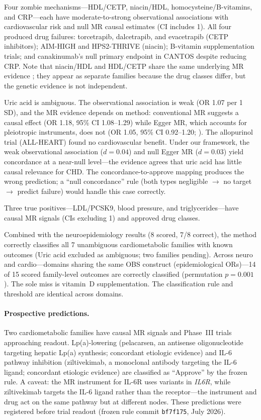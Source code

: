 \documentclass[11pt]{article}
\begin{document}
Four zombie mechanisms---HDL/CETP, niacin/HDL, homocysteine/B-vitamins, and CRP---each have moderate-to-strong observational associations with cardiovascular risk and null MR causal estimates (CI includes 1). All four produced drug failures: torcetrapib, dalcetrapib, and evacetrapib (CETP inhibitors); AIM-HIGH and HPS2-THRIVE (niacin); B-vitamin supplementation trials; and canakinumab's null primary endpoint in CANTOS despite reducing CRP. Note that niacin/HDL and HDL/CETP share the same underlying MR evidence \citep{voight2012}; they appear as separate families because the drug classes differ, but the genetic evidence is not independent.

Uric acid is ambiguous. The observational association is weak (OR 1.07 per 1 SD), and the MR evidence depends on method: conventional MR suggests a causal effect (OR 1.18, 95\% CI 1.08--1.29) while Egger MR, which accounts for pleiotropic instruments, does not (OR 1.05, 95\% CI 0.92--1.20; \citealp{white2016}). The allopurinol trial (ALL-HEART) found no cardiovascular benefit. Under our framework, the weak observational association ($d = 0.04$) and null Egger MR ($d = 0.03$) yield concordance at a near-null level---the evidence agrees that uric acid has little causal relevance for CHD. The concordance-to-approve mapping produces the wrong prediction; a ``null concordance'' rule (both types negligible $\to$ no target $\to$ predict failure) would handle this case correctly.

Three true positives---LDL/PCSK9, blood pressure, and triglycerides---have causal MR signals (CIs excluding 1) and approved drug classes.

Combined with the neuroepidemiology results (8 scored, 7/8 correct), the method correctly classifies all 7 unambiguous cardiometabolic families with known outcomes (Uric acid excluded as ambiguous; two families pending). Across neuro and cardio---domains sharing the same OBS construct (epidemiological ORs)---14 of 15 scored family-level outcomes are correctly classified (permutation $p = 0.001$). The sole miss is vitamin~D supplementation. The classification rule and threshold are identical across domains.

\paragraph{Prospective predictions.}
Two cardiometabolic families have causal MR signals and Phase~III trials approaching readout. Lp(a)-lowering (pelacarsen, an antisense oligonucleotide targeting hepatic Lp(a) synthesis; concordant etiologic evidence) and IL-6 pathway inhibition (ziltivekimab, a monoclonal antibody targeting the IL-6 ligand; concordant etiologic evidence) are classified as ``Approve'' by the frozen rule. A caveat: the MR instrument for IL-6R uses variants in \emph{IL6R}, while ziltivekimab targets the IL-6 ligand rather than the receptor---the instrument and drug act on the same pathway but at different nodes. These predictions were registered before trial readout (frozen rule commit \texttt{bf7f175}, July 2026).
\end{document}
